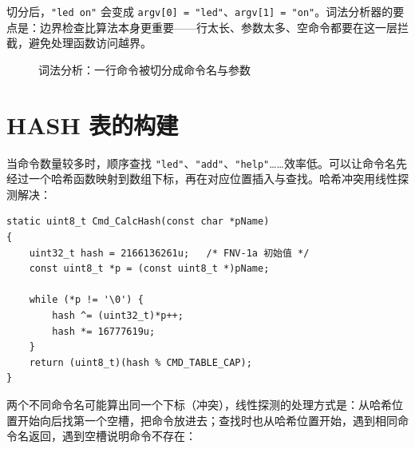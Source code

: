 切分后，\texttt{"led on"} 会变成 \texttt{argv[0] = "led"}、\texttt{argv[1] = "on"}。词法分析器的要点是：边界检查比算法本身更重要——行太长、参数太多、空命令都要在这一层拦截，避免处理函数访问越界。

\begin{figure}[htbp]
\centering
\caption{词法分析：一行命令被切分成命令名与参数} \label{fig:cmd-token}
\end{figure}

\section{HASH 表的构建}

当命令数量较多时，顺序查找 \texttt{"led"}、\texttt{"add"}、\texttt{"help"}……效率低。可以让命令名先经过一个哈希函数映射到数组下标，再在对应位置插入与查找。哈希冲突用线性探测解决：

\begin{lstlisting}[style=c]
static uint8_t Cmd_CalcHash(const char *pName)
{
    uint32_t hash = 2166136261u;   /* FNV-1a 初始值 */
    const uint8_t *p = (const uint8_t *)pName;

    while (*p != '\0') {
        hash ^= (uint32_t)*p++;
        hash *= 16777619u;
    }
    return (uint8_t)(hash % CMD_TABLE_CAP);
}
\end{lstlisting}

两个不同命令名可能算出同一个下标（冲突），线性探测的处理方式是：从哈希位置开始向后找第一个空槽，把命令放进去；查找时也从哈希位置开始，遇到相同命令名返回，遇到空槽说明命令不存在：

